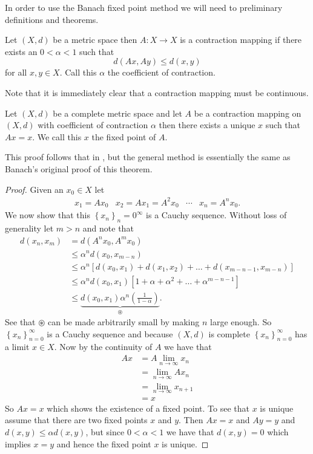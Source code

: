 \documentclass{article}
\begin{document}
In order to use the Banach fixed point method we will need to preliminary definitions and theorems. 

\begin{definition}
Let $ (X,d) $ be a metric space then $ A : X \longrightarrow X $ is a contraction mapping if there exists
an $ 0 < \alpha < 1 $ such that
$$
	d(Ax,Ay) \leq d(x,y) 
$$
for all $ x, y \in X $. Call this $ \alpha $ the coefficient of contraction. 
\end{definition}

Note that it is immediately clear that a contraction mapping must be continuous.

\begin{theorem}
	Let $ (X,d) $ be a complete metric space and let $ A $ be a contraction mapping on $ (X, d) $ with 
	coefficient of contraction $ \alpha $ then 
	there exists a unique $ x $ such that $ Ax = x $. We call this $ x $ the fixed point of $ A $. 
\end{theorem}
This proof follows that in \cite{Kolmogorov1975}, but the general method is essentially the same as Banach's
original proof of this theorem.
\begin{proof}
	Given an $ x_0 \in X $ let
	\begin{align*}
		x_1 = Ax_0 & x_2 = Ax_1 = A^2x_0 & \cdots & x_n = A^n x_0.
	\end{align*}
	We now show that this $ \left\{ x_n \right\}_n=0^\infty $ is a Cauchy sequence.
	Without loss of generality  let $m > n $ and note that
	\begin{align*}
		d(x_n, x_m) &= d(A^nx_0, A^mx_0) \\
			&\leq \alpha^n d(x_0, x_{m-n}) \\
			&\leq \alpha^n \left[ d(x_0, x_1) + d(x_1, x_2) + \ldots + d(x_{m-n-1}, x_{m-n}) \right] \\
			&\leq \alpha^n d(x_0, x_1) \left[ 1 + \alpha + \alpha^2 + \ldots + \alpha^{m-n-1} \right] \\
			&\leq \underbrace{d(x_0, x_1) \alpha^n \left( \frac{1}{1-\alpha} \right)}_{\circledast}.
	\end{align*}
	See that $ \circledast $ can be made arbitrarily small by making $ n $ large enough. So $ \left\{ x_n \right\}_{n=0}^\infty $
	is a Cauchy sequence and because $ (X, d) $ is complete $ \left\{ x_n \right\}_{n=0}^\infty  $ has a limit $ x \in X $.
	Now by the continuity of $ A $ we have that 
	\begin{align*}
		Ax &= A \lim_{n\longrightarrow \infty} x_n \\
			&= \lim_{n \longrightarrow \infty} Ax_n \\
			&= \lim_{n \longrightarrow \infty} x_{n+1} \\
			&= x
	\end{align*}
	So $ Ax = x $ which shows the existence of a fixed point. To see that $ x $ is unique assume that there
	are two fixed points $ x $ and $ y $. Then $ Ax = x $ and $ Ay = y $
	and $ d(x,y) \leq \alpha d(x,y) $, but since $ 0 < \alpha < 1 $ we have that $ d(x,y) = 0 $ which implies
	$ x = y $ and hence the fixed point $ x $ is unique.
\end{proof}
\end{document}
